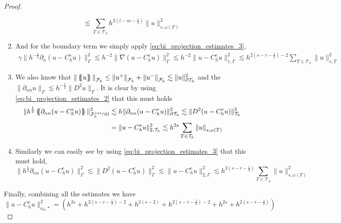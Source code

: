 \begin{proof}
\begin{enumerate}[label=\arabic*)]
{\[                                                                                                                 \lesssim \sum_{T \in \mathcal{T}_{h} }^{}
                                                                                                                 h^{ 2(l - m - \frac{1}{2})  } \| u      \|_{ s, \omega (  F)  }^{  2}
    \]  }
\item
    And for the boundary term we simply apply \eqref{eq:bi_projection_estimates_3}, \[
        \begin{split}
            \gamma \| h^{-\frac{1}{2}}  \partial _{n} ( u - C_{h}^{e}u ) \|_{ \Gamma    }^{  2} \lesssim h^{-2} \|   \nabla  ( u - C_{h}^{e}u )    \|_{ \Gamma  }^{2  } \lesssim  h^{-2} \|    u - C_{h}^{e}u     \|_{1, \Gamma  }^{2  }\lesssim h^{2(s- r-
            \frac{1}{2}) -2}
              \sum_{T \in \mathcal{T} _{h}}^{}  \| u \|_{s,T  }^{  2}
        \end{split}
    \]
\item

            We also know that $\| \left\{\!\!\left\{ u \right\}\!\!\right\}   \|_{ \mathcal{F} _{h} }^{  } \le \| u^{+} \|_{ \mathcal{F} _{h}  }^{  } + \| u^{-} \|_{ \mathcal{F} _{h}  }^{  }   \lesssim  \| u \|_{ \partial\mathcal{T }_{h}  }^{2  }  $ and the $\| \partial _{nn} u \|_{ F  }^{} \lesssim h^{-\frac{1}{2}} \| D^2 u \|_{ T }^{  }  $. It is clear
            by using \eqref{eq:bi_projection_estimates_2} that this must holds
            \[
                \begin{split}
 \| h^{\frac{1}{2}} \left\{\!\!\left\{ \partial _{nn} (u - C_{h}^{e}u) \right\}\!\!\right\}   \|_{\mathcal{F} _{h}^{int} \cap \Omega   }^{  2} &  \lesssim h^{} \|   \partial _{nn} (u - C_{h}^{e}u)    \|_{\partial \mathcal{T} _{h}   }^{  2}  \lesssim  \|   D^2 (u - C_{h}^{e}u)    \|_{ \mathcal{T} _{h}   }^{  2} \\
                                                                                                                &  = \|   u - C_{h}^{e}u    \|_{ 2, \mathcal{T} _{h}   }^{  2} \lesssim h^{2s} \sum_{T \in \mathcal{T}_h}^{} \| u \|_{s, \omega ( T)   }^{  }
                \end{split}
            \]
            \item
                Similarly we can easily see by using \eqref{eq:bi_projection_estimates_3} that this must hold,
                \[
              \| h^{\frac{1}{2}} \partial _{nn}(u - C_{h}^{e}u)     \|_{ \Gamma }^{  2} \lesssim   \|  D^2(u - C_{h}^{e}u)     \|_{ \Gamma  }^{  2} \lesssim \|  u - C_{h}^{e}u \|_{ 2, \Gamma}^{2  } \lesssim h^{2(s-r -\frac{1}{2})} \sum_{T \in
              \mathcal{T}_h }^{} \| u \|_{ s, \omega ( T)  }^{2  }
            \]
    \end{enumerate}

    Finally, combining all the estimates we have
    \[
                \| u - C_{h}^{e}u \|_{ a_{h}, * }^{  2} = (h^{2s} + h^{2(s -r- \frac{1}{2}) -2} + h^{2(s-2)} + h^{2(s -r- \frac{1}{2}) -2} + h^{2s} + h^{2(s -r- \frac{1}{2})} )
    \]
\end{proof}
